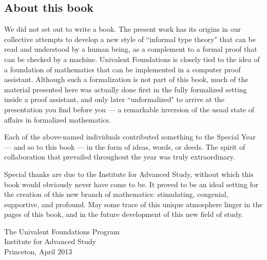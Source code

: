 \subsection*{About this book}

We did not set out to write a book. The present work has its origins in our collective attempts to develop a new style of ``informal type theory" that can be read and understood by a human being, as a complement to a formal proof that can be checked by a machine.  
Univalent Foundations is closely tied to the idea of a foundation of mathematics that can be implemented in a computer proof assistant.  Although such a formalization is not part of this book, much of the material presented here was actually done first in the fully formalized setting inside a proof assistant, and only later ``unformalized" to arrive at the presentation you find before you --- a remarkable inversion of the usual state of affairs in formalized mathematics.  

Each of the above-named individuals contributed something to the Special Year --- and so to this book --- in the form of ideas, words, or deeds.  The spirit of collaboration that prevailed throughout the year was truly extraordinary. 

Special thanks are due to the Institute for Advanced Study, without which this book would obviously never have come to be.  It proved  to be an ideal setting for the creation of this new branch of mathematics: stimulating, congenial, supportive, and profound.  May some trace of this unique atmosphere linger in the pages of this book, and in the future development of this new field of study.

\bigskip

\begin{flushright}
The Univalent Foundations Program\\
Institute for Advanced Study\\
Princeton, April 2013
\end{flushright}

